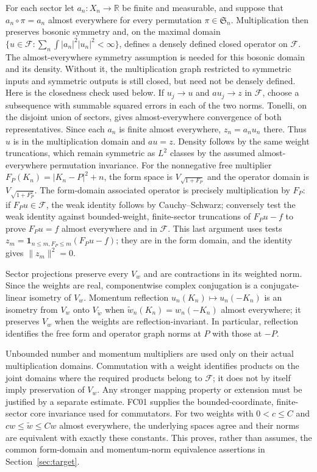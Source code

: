 \documentclass[11pt,a4paper]{article}
\theoremstyle{remark}\newtheorem{remark}[theorem]{Remark}
\newcommand{\R}{\mathbb R}\newcommand{\C}{\mathbb C}\newcommand{\N}{\mathbb N}
\newcommand{\F}{\mathcal F}\newcommand{\Q}{\mathcal Q}\newcommand{\HH}{\mathcal H}
\begin{document}
For each sector let $a_n:X_n\to\R$ be finite and measurable, and suppose that $a_n\circ\pi=a_n$ almost everywhere for every permutation $\pi\in\mathfrak S_n$. Multiplication then preserves bosonic symmetry and, on the maximal domain
$\{u\in\F:\sum_n\int |a_n|^2|u_n|^2<\infty\}$, defines a densely defined closed operator on $\F$. The almost-everywhere symmetry assumption is needed for this bosonic domain and its density. Without it, the multiplication graph restricted to symmetric inputs and symmetric outputs is still closed, but need not be densely defined. Here is the closedness check used below. If $u_j\to u$ and $au_j\to z$ in $\F$, choose a subsequence with summable squared errors in each of the two norms. Tonelli, on the disjoint union of sectors, gives almost-everywhere convergence of both representatives. Since each $a_n$ is finite almost everywhere, $z_n=a_nu_n$ there. Thus $u$ is in the multiplication domain and $au=z$. Density follows by the same weight truncations, which remain symmetric as $L^2$ classes by the assumed almost-everywhere permutation invariance. For the nonnegative free multiplier
$F_P(K_n)=|K_n-P|^2+n$, the form space is $V_{\sqrt{1+F_P}}$ and the operator domain is $V_{\sqrt{1+F_P^2}}$. The form-domain associated operator is precisely multiplication by $F_P$: if $F_Pu\in\F$, the weak identity follows by Cauchy--Schwarz; conversely test the weak identity against bounded-weight, finite-sector truncations of $F_Pu-f$ to prove $F_Pu=f$ almost everywhere and in $\F$. This last argument uses tests $z_m=\mathbf1_{n\leq m,F_P\leq m}(F_Pu-f)$; they are in the form domain, and the identity gives $\|z_m\|^2=0$.

Sector projections preserve every $V_w$ and are contractions in its weighted norm. Since the weights are real, componentwise complex conjugation is a conjugate-linear isometry of $V_w$. Momentum reflection $u_n(K_n)\mapsto u_n(-K_n)$ is an isometry from $V_w$ onto $V_{\widetilde w}$ when $\widetilde w_n(K_n)=w_n(-K_n)$ almost everywhere; it preserves $V_w$ when the weights are reflection-invariant. In particular, reflection identifies the free form and operator graph norms at $P$ with those at $-P$.

Unbounded number and momentum multipliers are used only on their actual multiplication domains. Commutation with a weight identifies products on the joint domains where the required products belong to $\F$; it does not by itself imply preservation of $V_w$. Any stronger mapping property or extension must be justified by a separate estimate. FC01 supplies the bounded-coordinate, finite-sector core invariance used for commutators. For two weights with $0<c\leq C$ and $c w\leq \widetilde w\leq Cw$ almost everywhere, the underlying spaces agree and their norms are equivalent with exactly these constants. This proves, rather than assumes, the common form-domain and momentum-norm equivalence assertions in Section~\ref{sec:target}.
\end{document}
